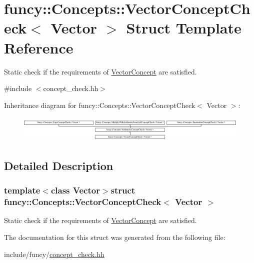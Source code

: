 \hypertarget{structfuncy_1_1Concepts_1_1VectorConceptCheck}{\section{funcy\-:\-:Concepts\-:\-:Vector\-Concept\-Check$<$ Vector $>$ Struct Template Reference}
\label{structfuncy_1_1Concepts_1_1VectorConceptCheck}
}


Static check if the requirements of \hyperlink{structfuncy_1_1Concepts_1_1VectorConcept}{Vector\-Concept} are satisfied.  




{\ttfamily \#include $<$concept\-\_\-check.\-hh$>$}

Inheritance diagram for funcy\-:\-:Concepts\-:\-:Vector\-Concept\-Check$<$ Vector $>$\-:\begin{figure}[H]
\begin{center}
\leavevmode
\includegraphics[height=1.284404cm]{structfuncy_1_1Concepts_1_1VectorConceptCheck}
\end{center}
\end{figure}


\subsection{Detailed Description}
\subsubsection*{template$<$class Vector$>$struct funcy\-::\-Concepts\-::\-Vector\-Concept\-Check$<$ Vector $>$}

Static check if the requirements of \hyperlink{structfuncy_1_1Concepts_1_1VectorConcept}{Vector\-Concept} are satisfied. 

The documentation for this struct was generated from the following file\-:\begin{DoxyCompactItemize}
\item 
include/funcy/\hyperlink{concept__check_8hh}{concept\-\_\-check.\-hh}\end{DoxyCompactItemize}
